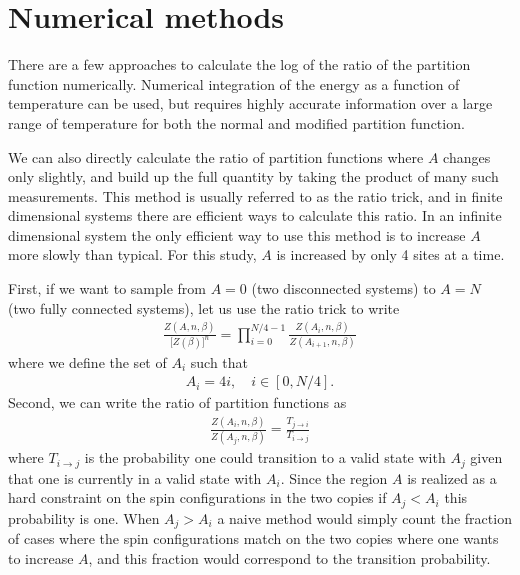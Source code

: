 \documentclass{article}
\begin{document}
 

\section{Numerical methods}

There are a few approaches to calculate the log of the ratio of the partition function numerically.
Numerical integration of the energy as a function of temperature\cite{jaconis-2013} can be used, but requires highly accurate information over a large range of temperature for both the normal and modified partition function.

We can also directly calculate the ratio of partition functions where $A$ changes only slightly, and build up the full quantity by taking the product of many such measurements.
This method is usually referred to as the ratio trick, and in finite dimensional systems there are efficient ways to calculate this ratio\cite{stephan-2014}.
In an infinite dimensional system the only efficient way to use this method is to increase $A$ more slowly than typical.
For this study, $A$ is increased by only 4 sites at a time.

First, if we want to sample from $A=0$ (two disconnected systems) to $A=N$ (two fully connected systems), let us use the ratio trick to write
\begin{align}
\frac{Z(A,n,\beta)}{\bigl[ Z(\beta) \bigr]^n} = \prod_{i=0}^{N/4-1} \frac{Z(A_i,n,\beta)}{Z(A_{i+1},n,\beta)}
\end{align}
where we define the set of $A_i$ such that
\begin{align}
A_i = 4i,\quad i \in [0,N/4] .
\end{align}
Second, we can write the ratio of partition functions as
\begin{align}
\frac{Z(A_i,n,\beta)}{Z(A_{j},n,\beta)} = \frac{T_{j\rightarrow i}}{T_{i\rightarrow j}}
\end{align}
where $T_{i\rightarrow j}$  is the probability one could transition to a valid state with $A_j$ given that one is currently in a valid state with $A_i$.
Since the region $A$ is realized as a hard constraint on the spin configurations in the two copies if $A_j < A_i$ this probability is one.
When $A_j > A_i$ a naive method would simply count the fraction of cases where the spin configurations match on the two copies where one wants to increase $A$, and this fraction would correspond to the transition probability.
\end{document}
